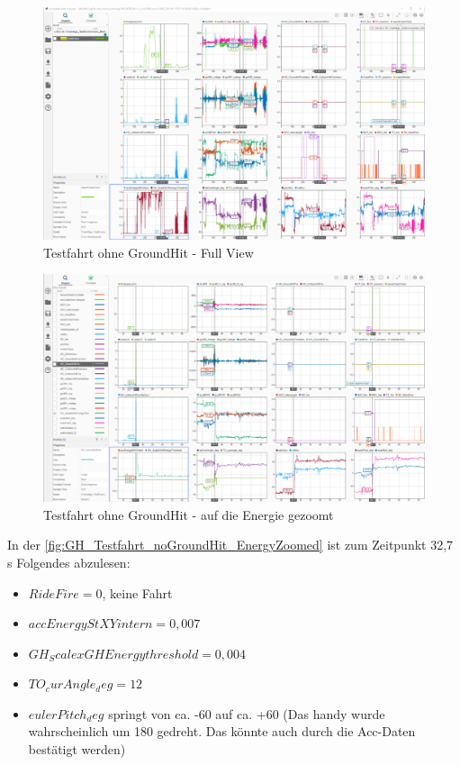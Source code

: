 \begin{figure}[H]
	\centering
	\includegraphics[width=\linewidth]{Bilder/GH_Testfahrt_noGroundHit_FullView.png}
	\caption{Testfahrt ohne GroundHit - Full View}
	\label{fig:GH_Testfahrt_noGroundHit_FullView}
\end{figure}
\begin{figure}[H]
	\centering
	\includegraphics[width=\linewidth]{Bilder/GH_Testfahrt_noGroundHit_EnergyZoomed.png}
	\caption{Testfahrt ohne GroundHit - auf die Energie gezoomt}
	\label{fig:GH_Testfahrt_noGroundHit_EnergyZoomed}
\end{figure}
In der \autoref{fig:GH_Testfahrt_noGroundHit_EnergyZoomed} ist zum Zeitpunkt 32,7 s Folgendes abzulesen:
\begin{itemize}
	\item $RideFire = 0$, keine Fahrt
	\item $accEnergyStXYintern = 0,007$
	\item $GH_ScalexGHEnergythreshold = 0,004$
	\item $TO_curAngle_deg = 12$
	\item $eulerPitch_deg$ springt von ca. -60 auf ca. +60 (Das handy wurde wahrscheinlich um 180 gedreht. Das könnte auch durch die Acc-Daten bestätigt werden)
\end{itemize}

